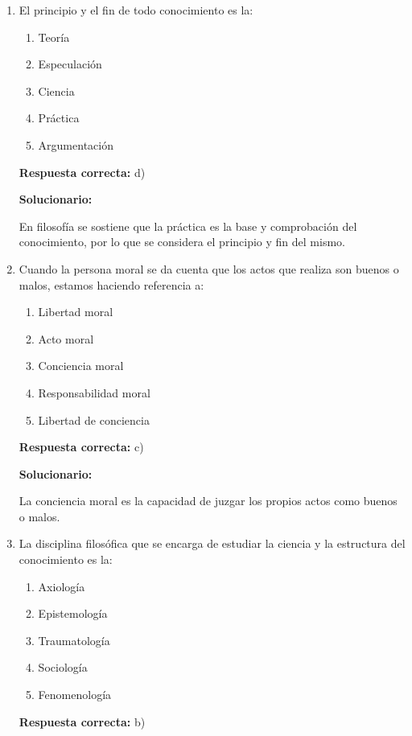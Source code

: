 \begin{enumerate}[resume]
	
	\item El principio y el fin de todo conocimiento es la:
	\begin{enumerate}[label=\alph*)]
		\item Teoría
		\item Especulación
		\item Ciencia
		\item Práctica
		\item Argumentación
	\end{enumerate}
	\textbf{Respuesta correcta:} d)
	
	\vspace{2mm}
	\textbf{Solucionario:}
	
	En filosofía se sostiene que la práctica es la base y comprobación del conocimiento, por lo que se considera el principio y fin del mismo.
	
	\vspace{6mm}
	
	\item Cuando la persona moral se da cuenta que los actos que realiza son buenos o malos, estamos haciendo referencia a:
	\begin{enumerate}[label=\alph*)]
		\item Libertad moral
		\item Acto moral
		\item Conciencia moral
		\item Responsabilidad moral
		\item Libertad de conciencia
	\end{enumerate}
	\textbf{Respuesta correcta:} c)
	
	\vspace{2mm}
	\textbf{Solucionario:}
	
	La conciencia moral es la capacidad de juzgar los propios actos como buenos o malos.
	
	\vspace{6mm}
	
	\item La disciplina filosófica que se encarga de estudiar la ciencia y la estructura del conocimiento es la:
	\begin{enumerate}[label=\alph*)]
		\item Axiología
		\item Epistemología
		\item Traumatología
		\item Sociología
		\item Fenomenología
	\end{enumerate}
	\textbf{Respuesta correcta:} b)
	

\end{enumerate}
